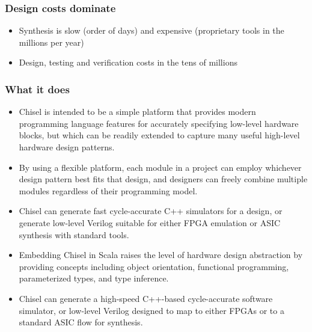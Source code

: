 \documentclass{beamer}
\begin{document}
\begin{frame}
\frametitle{Design costs dominate}
\begin{itemize}

\item Synthesis is slow (order of days) and expensive (proprietary tools in the millions per year)

\item Design, testing and verification costs in the tens of millions

\end{itemize}
\end{frame}

\begin{frame}
\frametitle{What it does}
\begin{itemize}

\item Chisel is intended to be a simple platform that provides modern programming language features for accurately specifying low-level hardware blocks, but which can be readily extended to capture many useful high-level hardware design patterns.

\item By using a flexible platform, each module in a project can employ whichever design pattern best fits that design, and designers can freely combine multiple modules regardless of their programming model.

\item Chisel can generate fast cycle-accurate C++ simulators for a design, or generate low-level Verilog suitable for either FPGA emulation or ASIC synthesis with standard tools.

\end{itemize}
\end{frame}

\begin{frame}
\begin{itemize}

\item Embedding Chisel in Scala raises the level of hardware design abstraction by providing concepts including object orientation, functional programming, parameterized types, and type inference.

\item Chisel can generate a high-speed C++-based cycle-accurate software simulator, or low-level Verilog designed to map to either FPGAs or to a standard ASIC flow for synthesis.

\end{itemize}
\end{frame}
\end{document}
